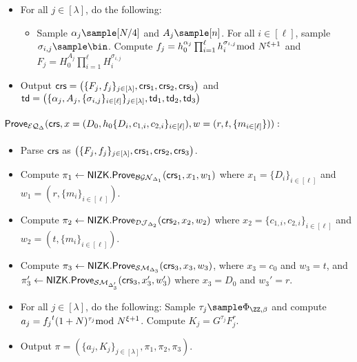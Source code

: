 \begin{construction}
\begin{itemize}
    \item For all $j\in [\lambda]$, do the following:
    \begin{itemize}
 \item Sample $\alpha_j\sample [N/4]$ and $A_j\sample [n]$. For all $i\in[\ell]$, sample $\sigma_{i,j}\sample\bin$. Compute  $f_{j}=h_0^{\alpha_j} \prod_{i=1}^\ell h_i^{\sigma_{i,j}} \!\!\!\!\mod N^{\xi+1}$ and $F_j=H_0^{A_j}\prod_{i=1}^\ell H_{i}^{\sigma_{i,j}}$
 \end{itemize}
   
    \item Output $\mathsf{crs}=\left( \{F_j,f_j\}_{j\in [\lambda]},\mathsf{crs}_1,\mathsf{crs}_2,\mathsf{crs}_3\right)$ and $\mathsf{td}=\left(\{\alpha_j,A_j,\{\sigma_{i,j}\}_{{i}\in[\ell]}\}_{j\in[\lambda]},\mathsf{td}_1,\mathsf{td}_2,\mathsf{td}_3\right)$
\end{itemize}

\paragraph{$\mathsf{Prove}_{\mathcal{EQ}_{\Delta}}(\mathsf{crs},x=(D_0,h_0\{D_i,c_{1,i},c_{2,i}\}_{i\in[\ell]}),w=(r,t,\{m_{i\in[\ell]}\})):$}
\begin{itemize}
    \item Parse $\mathsf{crs}$ as $\left( \{F_j,f_j\}_{j\in [\lambda]},\mathsf{crs}_1,\mathsf{crs}_2,\mathsf{crs}_3\right)$.
    \item Compute $\pi_1\leftarrow\mathsf{NIZK.Prove}_{\mathcal{BGN}_{\Delta_1}}(\mathsf{crs}_1, x_1, w_1)$ where $x_1=\{D_i\}_{i\in[\ell]}$ and $ w_1=(r,\{m_i\}_{i\in[\ell]})$.
    \item Compute $\pi_2\leftarrow\mathsf{NIZK.Prove}_{\mathcal{DJ}_{\Delta_2}}(\mathsf{crs}_2, x_2,w_2)$ where $ x_2=\{c_{1,i},c_{2,i}\}_{i\in[\ell]}$ and $ w_2=(t,\{m_i\}_{i\in[\ell]})$.
    \item Compute $\pi_3\leftarrow\mathsf{NIZK.Prove}_{\mathcal{SM}_{\Delta_3}}(\mathsf{crs}_3,x_3,w_3)$, where $x_3=c_0$ and $w_3=t$,  and $\pi_3'\leftarrow\mathsf{NIZK.Prove}_{\mathcal{SM}_{\Delta_3'}}(\mathsf{crs}_3,x_3',w_3')$ where $x_3=D_0$ and $w_3'=r$.
    
  
    \item For all $j\in [\lambda]$, do the following:
 Sample $\tau_j\sample \Phi_{\ZZ,\beta}$ and compute $a_{j}={f_{j}}^{t}(1+N)^{\tau_{j}}\!\!\!\!\mod N^{\xi+1}$.  Compute $K_j=G^{\tau_j}F_j^r$. 
    \item Output $\pi=\left(\{a_j,K_j\}_{j\in [\lambda]},\pi_1,\pi_2,\pi_3\right)$.
\end{itemize}


\end{construction}
